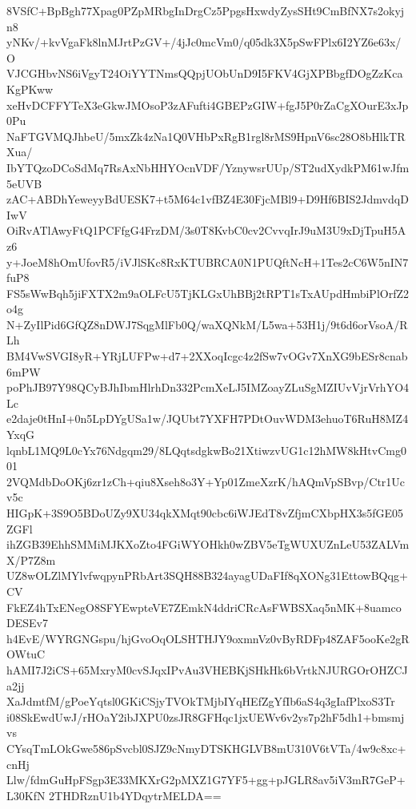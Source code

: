 8VSfC+BpBgh77Xpag0PZpMRbgInDrgCz5PpgsHxwdyZysSHt9CmBfNX7s2okyjn8
yNKv/+kvVgaFk8lnMJrtPzGV+/4jJc0mcVm0/q05dk3X5pSwFPlx6I2YZ6e63x/O
VJCGHbvNS6iVgyT24OiYYTNmsQQpjUObUnD9I5FKV4GjXPBbgfDOgZzKcaKgPKww
xeHvDCFFYTeX3eGkwJMOsoP3zAFufti4GBEPzGIW+fgJ5P0rZaCgXOurE3xJp0Pu
NaFTGVMQJhbeU/5mxZk4zNa1Q0VHbPxRgB1rgl8rMS9HpnV6sc28O8bHlkTRXua/
IbYTQzoDCoSdMq7RsAxNbHHYOcnVDF/YznywsrUUp/ST2udXydkPM61wJfm5eUVB
zAC+ABDhYeweyyBdUESK7+t5M64c1vfBZ4E30FjcMBl9+D9Hf6BIS2JdmvdqDIwV
OiRvATlAwyFtQ1PCFfgG4FrzDM/3s0T8KvbC0cv2CvvqIrJ9uM3U9xDjTpuH5Az6
y+JoeM8hOmUfovR5/iVJlSKc8RxKTUBRCA0N1PUQftNcH+1Tes2cC6W5nIN7fuP8
FS5sWwBqh5jiFXTX2m9aOLFcU5TjKLGxUhBBj2tRPT1sTxAUpdHmbiPlOrfZ2o4g
N+ZyIlPid6GfQZ8nDWJ7SqgMlFb0Q/waXQNkM/L5wa+53H1j/9t6d6orVsoA/RLh
BM4VwSVGI8yR+YRjLUFPw+d7+2XXoqIcgc4z2fSw7vOGv7XnXG9bESr8cnab6mPW
poPhJB97Y98QCyBJhIbmHlrhDn332PcmXeLJ5IMZoayZLuSgMZIUvVjrVrhYO4Lc
e2daje0tHnI+0n5LpDYgUSa1w/JQUbt7YXFH7PDtOuvWDM3ehuoT6RuH8MZ4YxqG
lqnbL1MQ9L0cYx76Ndgqm29/8LQqtsdgkwBo21XtiwzvUG1c12hMW8kHtvCmg001
2VQMdbDoOKj6zr1zCh+qiu8Xseh8o3Y+Yp01ZmeXzrK/hAQmVpSBvp/Ctr1Ucv5c
HIGpK+3S9O5BDoUZy9XU34qkXMqt90cbc6iWJEdT8vZfjmCXbpHX3s5fGE05ZGFl
ihZGB39EhhSMMiMJKXoZto4FGiWYOHkh0wZBV5eTgWUXUZnLeU53ZALVmX/P7Z8m
UZ8wOLZlMYlvfwqpynPRbArt3SQH88B324ayagUDaFIf8qXONg31EttowBQqg+CV
FkEZ4hTxENegO8SFYEwpteVE7ZEmkN4ddriCRcAsFWBSXaq5nMK+8uamcoDESEv7
h4EvE/WYRGNGspu/hjGvoOqOLSHTHJY9oxmnVz0vByRDFp48ZAF5ooKe2gROWtuC
hAMI7J2iCS+65MxryM0cvSJqxIPvAu3VHEBKjSHkHk6bVrtkNJURGOrOHZCJa2jj
XaJdmtfM/gPoeYqtsl0GKiCSjyTVOkTMjbIYqHEfZgYfIb6aS4q3gIafPlxoS3Tr
i08SkEwdUwJ/rHOaY2ibJXPU0zsJR8GFHqc1jxUEWv6v2ys7p2hF5dh1+bmsmjvs
CYsqTmLOkGwe586pSvcbl0SJZ9cNmyDTSKHGLVB8mU310V6tVTa/4w9c8xc+cnHj
Llw/fdmGuHpFSgp3E33MKXrG2pMXZ1G7YF5+gg+pJGLR8av5iV3mR7GeP+L30KfN
2THDRznU1b4YDqytrMELDA==
